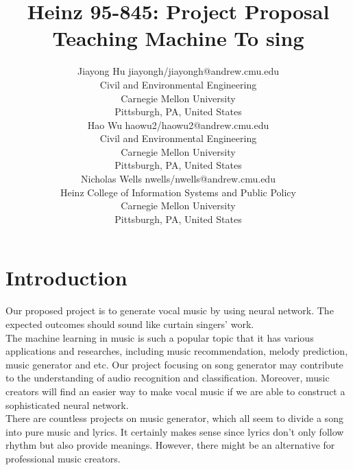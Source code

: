 \documentclass[twoside,11pt]{article}
\begin{document}
\title{Heinz 95-845: Project Proposal\\Teaching Machine To sing}

\author{\name Jiayong Hu \email jiayongh/jiayongh@andrew.cmu.edu \\
       \addr Civil and Environmental Engineering\\
       Carnegie Mellon University\\
       Pittsburgh, PA, United States \\
       \AND
       \name Hao Wu \email haowu2/haowu2@andrew.cmu.edu \\
       \addr Civil and Environmental Engineering\\
       Carnegie Mellon University\\
       Pittsburgh, PA, United States \\
       \AND
       \name Nicholas Wells \email nwells/nwells@andrew.cmu.edu \\
       \addr Heinz College of Information Systems and Public Policy\\
       Carnegie Mellon University\\
       Pittsburgh, PA, United States}
\maketitle

\section{Introduction} \label{details}

Our proposed project is to generate vocal music by using neural network. The expected outcomes should sound like curtain singers’ work.\\

The machine learning in music is such a popular topic that it has various applications and researches, including music recommendation, melody prediction, music generator and etc. Our project focusing on song generator may contribute to the understanding of audio recognition and classification. Moreover, music creators will find an easier way to make vocal music if we are able to construct a sophisticated neural network.\\

There are countless projects on music generator, which all seem to divide a song into pure music and lyrics\citep{cite1}. It certainly makes sense since lyrics don’t only follow rhythm but also provide meanings. However, there might be an alternative for professional music creators.\\
\end{document}
